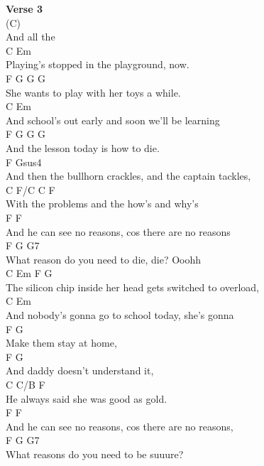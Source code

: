 \documentclass[a4paper]{article}
\begin{document}
{{        }
        \textbf{Verse 3}
        ~\\
        {
            \cutive
            \obeyspaces
(C)
\\
And all the
\\
C                        Em
\\
Playing's stopped in the playground, now. 
\\
    F                      G    G G
\\
She wants to play with her toys a while.
\\
    C                      Em
\\
And school's out early and soon we'll be learning
\\
        F               G   G  G
\\
And the lesson today is how to die.
\\
             F                          Gsus4
\\
And then the bullhorn crackles, and the captain tackles,
\\
         C                F/C   C   F
\\
With the problems and the how's and why's
\\
           F                         F
\\
And he can see no reasons, cos there are no reasons
\\
     F                     G         G7
\\
What reason do you need to die, die? Ooohh
\\
    C              Em                F               G
\\
The silicon chip inside her head gets switched to overload,
\\
    C                    Em
\\
And nobody's gonna go to school today, she's gonna
\\
F                 G
\\
Make them stay at home,
\\
    F                  G
\\
And daddy doesn't understand it, 
\\
          C            C/B     F
\\
He always said she was good as gold.
\\
           F                         F
\\
And he can see no reasons, cos there are no reasons,
\\
     F                         G    G7
\\
What reasons do you need to be suuure?
\\

}}
\end{document}
